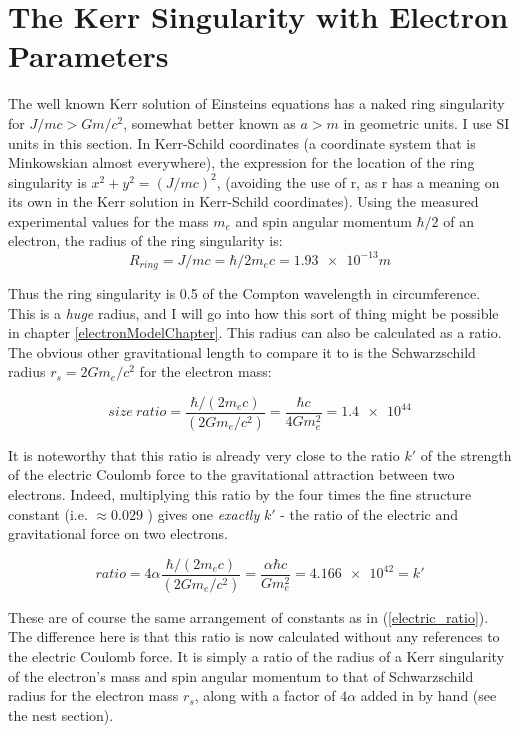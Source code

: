 \documentclass[../rzero]{subfiles}
\begin{document}
\section{The Kerr Singularity with Electron Parameters}
The well known Kerr solution of Einsteins equations has a naked ring singularity for $J/mc > Gm/c^2$, somewhat better known as $a > m$ in geometric units. I use SI units in this section. In Kerr-Schild coordinates (a coordinate system that is Minkowskian almost everywhere)\cite{Visser2008}, the expression for the location of the ring singularity is $x^2 + y^2 = (J/mc)^2$, (avoiding the use of r, as r has a meaning on its own in the Kerr solution in Kerr-Schild coordinates). Using the measured experimental values for the mass $m_e$ and spin angular momentum $\hbar/2$ of an electron, the radius of the ring singularity is:
\begin{equation} \label{radius_eqn}
	R_{ring} = J/mc = \hbar/2m_ec = \num{1.93e-13}m
\end{equation}

Thus the ring singularity is 0.5 of the Compton wavelength in circumference. This is a \textit{huge} radius, and I will go into how this sort of thing might be possible in chapter \ref{electronModelChapter}. This radius can also be calculated as a ratio. The obvious other gravitational length to compare it to is the Schwarzschild radius $r_s = 2Gm_e/c^2$ for the electron mass:

\begin{equation}
	size \ ratio = \frac{\hbar/(2m_ec)}{(2Gm_e/c^2)} = \frac{\hbar c}{4G m_e^2} = \num{1.4e44}
\end{equation}

 It is noteworthy that this ratio is already very close to the ratio $k'$ of the strength of the electric Coulomb force to the gravitational attraction between two electrons. Indeed, multiplying this ratio by the four times the fine structure constant (i.e. $\approx 0.029 $ ) gives one \textit{exactly} $k'$ - the ratio of the electric and gravitational force on two electrons.
 
\begin{equation}
	ratio = 4\alpha \frac{\hbar/(2m_ec)}{(2Gm_e/c^2)} = \frac{\alpha \hbar c}{G m_e^2} = \num{4.166e42} = k'
\end{equation}


These are of course the same arrangement of constants as in (\ref{electric_ratio}). The difference here is that this ratio is now calculated without any references to the electric Coulomb force. It is simply a ratio of the radius of a Kerr singularity of the electron's mass and spin angular momentum to that of Schwarzschild radius for the electron mass $r_s$, along with a factor of $4\alpha$ added in by hand (see the nest section). 
\end{document}
